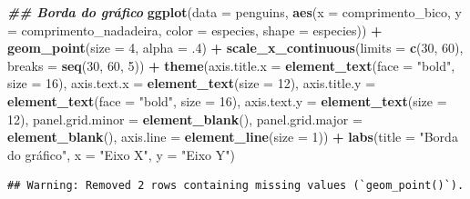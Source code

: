 \documentclass[
]{article}
\newenvironment{Shaded}{\begin{snugshade}}{\end{snugshade}}
\newcommand{\AttributeTok}[1]{\textcolor[rgb]{0.13,0.29,0.53}{#1}}
\newcommand{\DecValTok}[1]{\textcolor[rgb]{0.00,0.00,0.81}{#1}}
\newcommand{\DocumentationTok}[1]{\textcolor[rgb]{0.56,0.35,0.01}{\textbf{\textit{#1}}}}
\newcommand{\FunctionTok}[1]{\textcolor[rgb]{0.13,0.29,0.53}{\textbf{#1}}}
\newcommand{\NormalTok}[1]{#1}
\newcommand{\SpecialCharTok}[1]{\textcolor[rgb]{0.81,0.36,0.00}{\textbf{#1}}}
\newcommand{\StringTok}[1]{\textcolor[rgb]{0.31,0.60,0.02}{#1}}
\begin{document}
\begin{Shaded}
\begin{Highlighting}[]
\DocumentationTok{\#\# Borda do gráfico}
\FunctionTok{ggplot}\NormalTok{(}\AttributeTok{data =}\NormalTok{ penguins, }
       \FunctionTok{aes}\NormalTok{(}\AttributeTok{x =}\NormalTok{ comprimento\_bico, }\AttributeTok{y =}\NormalTok{ comprimento\_nadadeira,}
           \AttributeTok{color =}\NormalTok{ especies, }\AttributeTok{shape =}\NormalTok{ especies)) }\SpecialCharTok{+}
    \FunctionTok{geom\_point}\NormalTok{(}\AttributeTok{size =} \DecValTok{4}\NormalTok{, }\AttributeTok{alpha =}\NormalTok{ .}\DecValTok{4}\NormalTok{) }\SpecialCharTok{+}
    \FunctionTok{scale\_x\_continuous}\NormalTok{(}\AttributeTok{limits =} \FunctionTok{c}\NormalTok{(}\DecValTok{30}\NormalTok{, }\DecValTok{60}\NormalTok{), }\AttributeTok{breaks =} \FunctionTok{seq}\NormalTok{(}\DecValTok{30}\NormalTok{, }\DecValTok{60}\NormalTok{, }\DecValTok{5}\NormalTok{)) }\SpecialCharTok{+}
    \FunctionTok{theme}\NormalTok{(}\AttributeTok{axis.title.x =} \FunctionTok{element\_text}\NormalTok{(}\AttributeTok{face =} \StringTok{"bold"}\NormalTok{, }\AttributeTok{size =} \DecValTok{16}\NormalTok{),}
          \AttributeTok{axis.text.x =} \FunctionTok{element\_text}\NormalTok{(}\AttributeTok{size =} \DecValTok{12}\NormalTok{),}
          \AttributeTok{axis.title.y =} \FunctionTok{element\_text}\NormalTok{(}\AttributeTok{face =} \StringTok{"bold"}\NormalTok{, }\AttributeTok{size =} \DecValTok{16}\NormalTok{),}
          \AttributeTok{axis.text.y =} \FunctionTok{element\_text}\NormalTok{(}\AttributeTok{size =} \DecValTok{12}\NormalTok{),}
          \AttributeTok{panel.grid.minor =} \FunctionTok{element\_blank}\NormalTok{(),}
          \AttributeTok{panel.grid.major =} \FunctionTok{element\_blank}\NormalTok{(),}
          \AttributeTok{axis.line =} \FunctionTok{element\_line}\NormalTok{(}\AttributeTok{size =} \DecValTok{1}\NormalTok{)) }\SpecialCharTok{+}
    \FunctionTok{labs}\NormalTok{(}\AttributeTok{title =} \StringTok{"Borda do gráfico"}\NormalTok{, }\AttributeTok{x =} \StringTok{"Eixo X"}\NormalTok{, }\AttributeTok{y =} \StringTok{"Eixo Y"}\NormalTok{)}
\end{Highlighting}
\end{Shaded}

\begin{verbatim}
## Warning: Removed 2 rows containing missing values (`geom_point()`).
\end{verbatim}
\end{document}
